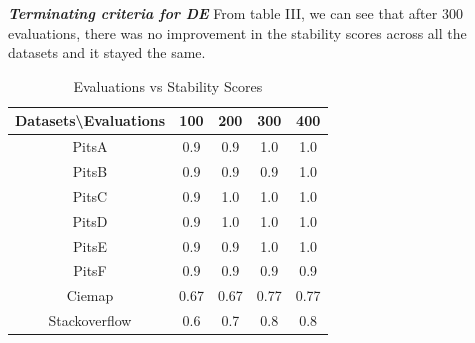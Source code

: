 \documentclass[10pt,conference]{IEEEtran}
\theoremstyle{break}
\begin{document}
\textit{\textbf{Terminating criteria for DE}} From table III, we can see that after 300 evaluations, there was no improvement in the stability scores across all the datasets and it stayed the same.

\begin{table}[!htbp]
\begin{center}
\begin{tabular}{|c|c|c|c|c|}
\hline 
\textbf{Datasets\textbackslash Evaluations} & \textbf{100} & \textbf{200} & \textbf{300} & \textbf{400} \\[0.5ex]
\hline
PitsA & 0.9 & 0.9 & 1.0 & 1.0\\ [0.5ex]
\hline
PitsB & 0.9 & 0.9 & 0.9 & 1.0 \\ [0.5ex]
\hline
PitsC & 0.9 & 1.0 & 1.0 & 1.0\\ [0.5ex]
\hline
PitsD & 0.9 & 1.0 & 1.0 & 1.0\\ [0.5ex]
\hline
PitsE & 0.9 & 0.9 & 1.0 & 1.0\\[0.5ex]
\hline
PitsF & 0.9 & 0.9 & 0.9 & 0.9\\[0.5ex]
\hline
Ciemap & 0.67 & 0.67 & 0.77 & 0.77\\[0.5ex]
\hline
Stackoverflow & 0.6 & 0.7 & 0.8 & 0.8\\[0.5ex]
\hline
\end{tabular}
\end{center}
\caption{Evaluations vs Stability Scores}
\label{tb:tablename1}
\end{table}

\end{document}
